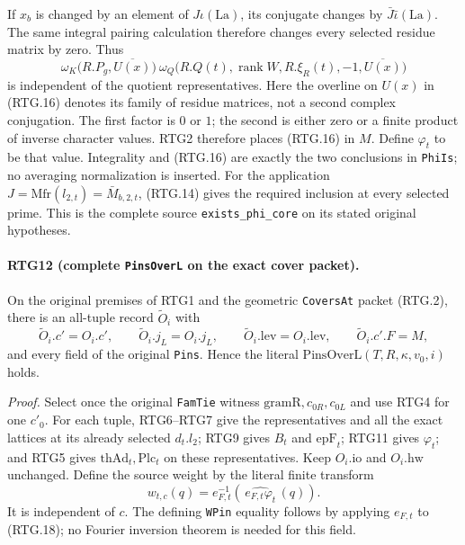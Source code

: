 If $x_b$ is changed by an element of $J\iota(\mathrm{La})$, its
conjugate changes by $\bar J\bar\iota(\mathrm{La})$.
The same integral pairing calculation therefore changes every selected
residue matrix by zero.  Thus
\[
 \omega_K\bigl(R.P_g,\overline{U(x)}\bigr)
 \ \omega_Q\bigl(R.Q(t),\operatorname{rank}W,
                      R.\xi_R(t),-1,\overline{U(x)}\bigr)
                                                               \tag{RTG.16}
\]
is independent of the quotient representatives.  Here the overline
on $U(x)$ in (RTG.16) denotes its family of residue matrices, not a
second complex conjugation.  The first factor is $0$ or $1$; the
second is either zero or a finite product of inverse character values.
RTG2 therefore places (RTG.16) in $M$.  Define $\varphi_t$ to be that
value.  Integrality and (RTG.16) are exactly the two conclusions in
\texttt{PhiIs}; no averaging normalization is inserted.
For the application $J=\mathrm{Mfr}(l_{2,t})=\bar M_{b,2,t}$,
(RTG.14) gives the required inclusion at every selected prime.
This is the complete source \texttt{exists\_\allowbreak phi\_\allowbreak core} on its stated
original hypotheses.

\paragraph{RTG12 (complete \texttt{PinsOverL} on the exact cover packet).}
\label{claim:RTG12}
On the original premises of RTG1 and the geometric \texttt{CoversAt}
packet (RTG.2), there is an all-tuple record $\widetilde O_i$ with
\[
 \widetilde O_i.c'=O_i.c',\qquad
 \widetilde O_i.j_L=O_i.j_L,\qquad
 \widetilde O_i.\mathrm{lev}=O_i.\mathrm{lev},\qquad
 \widetilde O_i.c'.F=M,                                    \tag{RTG.17}
\]
and every field of the original \texttt{Pins}.  Hence the literal
\(\mathrm{PinsOverL}(T,R,\kappa,v_0,i)\) holds.

\emph{Proof.}
Select once the original \texttt{FamTie} witness
$\mathrm{gramR},c_{0R},c_{0L}$ and use RTG4 for one $c'_0$.
For each tuple, RTG6--RTG7 give the representatives and all the exact
lattices at its already selected $d_t.l_2$; RTG9 gives $B_t$ and
$\mathrm{epF}_t$; RTG11 gives $\varphi_t$; and RTG5 gives
$\mathrm{thAd}_t,\mathrm{Plc}_t$ on these representatives.
Keep $O_i.\mathrm{io}$ and $O_i.\mathrm{hw}$ unchanged.  Define the
source weight by the literal finite transform
\[
 w_{t,c}(q)=e_{F,t}^{-1}
   \left(\widehat{\,e_{F,t}\varphi_t\,}(q)\right).             \tag{RTG.18}
\]
It is independent of $c$.  The defining \texttt{WPin} equality follows
by applying $e_{F,t}$ to (RTG.18); no Fourier inversion theorem is
needed for this field.

